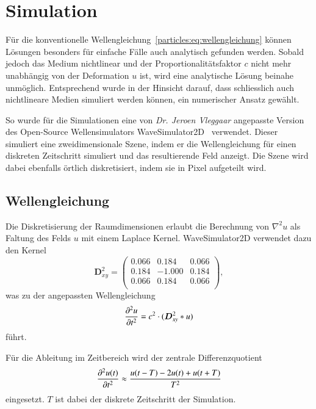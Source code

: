 %
%
%
%
\section{Simulation\label{particles:section:simulation}}

Für die konventionelle Wellengleichung~\eqref{particles:eq:wellengleichung} 
können Lösungen besonders für einfache Fälle auch analytisch gefunden werden.
Sobald jedoch das Medium nichtlinear und 
der Proportionalitätsfaktor $c$ nicht mehr unabhängig von der Deformation $u$ ist, 
wird eine analytische Lösung beinahe unmöglich.
Entsprechend wurde in der Hinsicht darauf, 
dass schliesslich auch nichtlineare Medien simuliert werden können, 
ein numerischer Ansatz gewählt.

So wurde für die Simulationen eine von \emph{Dr. Jeroen Vleggaar} angepasste Version des Open-Source Wellensimulators WaveSimulator2D~\cite{particles:repo-wavesim2d} verwendet.
Dieser simuliert eine zweidimensionale Szene, indem er die Wellengleichung für einen diskreten Zeitschritt simuliert und das resultierende Feld anzeigt.
Die Szene wird dabei ebenfalls örtlich diskretisiert, indem sie in Pixel aufgeteilt wird.

\subsection{Wellengleichung\label{particles:section:simulation:wellengleichung}}
Die Diskretisierung der Raumdimensionen erlaubt die Berechnung von $\nabla^2 u$ als Faltung des Felds $u$ mit einem Laplace Kernel.
WaveSimulator2D verwendet dazu den Kernel
\[
    \boldsymbol{D}^2_{xy} = 
    \begin{pmatrix}
        0.066 &  0.184 & 0.066\\
        0.184 & -1.000 & 0.184\\
        0.066 &  0.184 & 0.066\\
    \end{pmatrix},
\]
was zu der angepassten Wellengleichung 
\[
    \frac{\d^2 u}{\d t^2} = c^2 \cdot (\boldsymbol{D}^2_{xy} * u)
\]
führt.

Für die Ableitung im Zeitbereich wird der zentrale Differenzquotient
\[
    \frac{\d^2 u(t)}{\d t^2} \approx \frac{u(t-T) - 2u(t) + u(t+T)}{T^2}
\]
eingesetzt.
$T$ ist dabei der diskrete Zeitschritt der Simulation.

